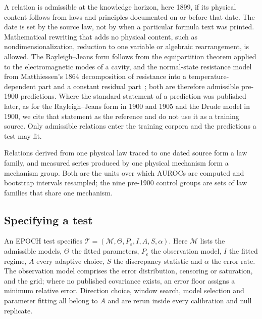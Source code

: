 \documentclass{article}
\begin{document}
A relation is admissible at the knowledge horizon, here 1899, if its physical content follows from laws and principles documented on or before that date. The date is set by the source law, not by when a particular formula text was printed. Mathematical rewriting that adds no physical content, such as nondimensionalization, reduction to one variable or algebraic rearrangement, is allowed. The Rayleigh--Jeans form follows from the equipartition theorem applied to the electromagnetic modes of a cavity, and the normal-state resistance model from Matthiessen's 1864 decomposition of resistance into a temperature-dependent part and a constant residual part~\cite{matthiessen1864}; both are therefore admissible pre-1900 predictions. Where the standard statement of a prediction was published later, as for the Rayleigh--Jeans form in 1900 and 1905 and the Drude model in 1900, we cite that statement as the reference and do not use it as a training source. Only admissible relations enter the training corpora and the predictions a test may fit.

Relations derived from one physical law traced to one dated source form a law family, and measured series produced by one physical mechanism form a mechanism group. Both are the units over which AUROCs are computed and bootstrap intervals resampled; the nine pre-1900 control groups are sets of law families that share one mechanism.

\subsection{Specifying a test}

An EPOCH test specifies
$\mathcal{T}=(\mathcal{M},\Theta,P_\varepsilon,I,A,S,\alpha)$. Here
$\mathcal{M}$ lists the admissible models, $\Theta$ the fitted parameters,
$P_\varepsilon$ the observation model, $I$ the fitted regime, $A$ every adaptive choice, $S$ the discrepancy
statistic and $\alpha$ the error rate. The observation model comprises the error distribution, censoring or saturation, and the grid; where no published covariance exists, an error floor assigns a minimum relative error. Direction choice, window search, model selection and parameter fitting all belong to $A$ and are rerun inside every calibration and null replicate.
\end{document}

